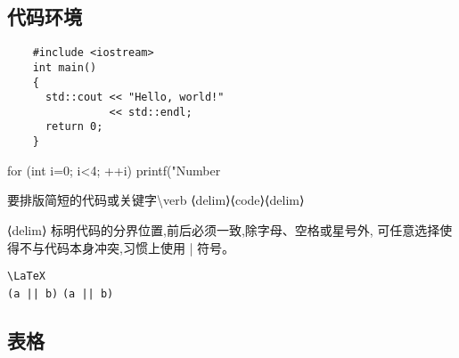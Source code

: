\documentclass[a4paper]{ctexart}
\begin{document}
\subsection{代码环境}
\begin{verbatim}
    #include <iostream>
    int main() 
    {
      std::cout << "Hello, world!"
                << std::endl;
      return 0;
    }
\end{verbatim}
\begin{verbatim*}
    for (int i=0; i<4; ++i)
      printf("Number %d\n",i);
\end{verbatim*}
要排版简短的代码或关键字\textbackslash verb ⟨delim⟩⟨code⟩⟨delim⟩\par
⟨delim⟩ 标明代码的分界位置,前后必须一致,除字母、空格或星号外,%
可任意选择使得不与代码本身冲突,习惯上使用 | 符号。\par
\verb|\LaTeX| \\ 
\verb+(a || b)+ \verb*+(a || b)+    
\subsection{表格}
\end{document}
